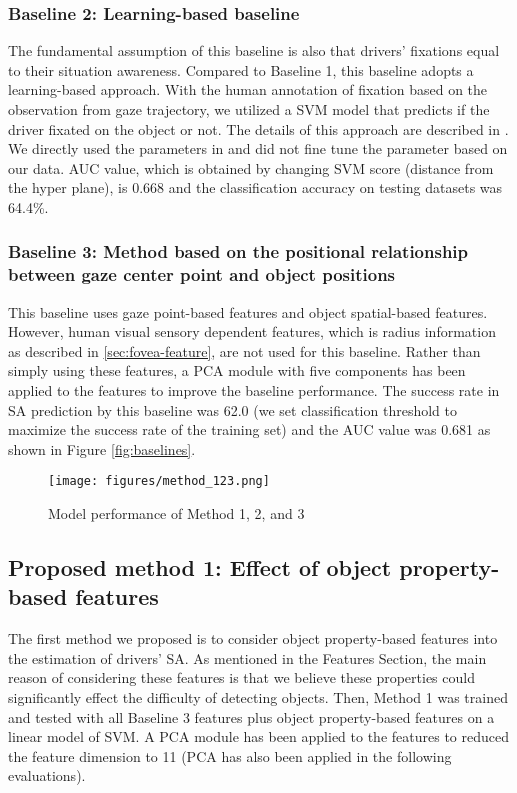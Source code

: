 \documentclass[letterpaper, 10 pt, conference]{ieeeconf}  %
\begin{document}
\subsubsection{Baseline 2: Learning-based baseline}

The fundamental assumption of this baseline is also that drivers' fixations equal to their situation awareness. Compared to Baseline 1, this baseline adopts a learning-based approach. With the human annotation of fixation based on the observation from gaze trajectory, we utilized a SVM model that predicts if the driver fixated on the object or not. The details of this approach are described in \cite{martin2018object}. We directly used the parameters in \cite{martin2018object} and did not fine tune the parameter based on our data. AUC value, which is obtained by changing SVM score (distance from the hyper plane), is 0.668 and the classification accuracy on testing datasets was 64.4\%.

\subsubsection{Baseline 3: Method based on the positional relationship between gaze center point and object positions}

This baseline uses gaze point-based features and object spatial-based features. However, human visual sensory dependent features, which is radius information as described in \ref{sec:fovea-feature}, are not used for this baseline. Rather than simply using these features, a PCA module with five components has been applied to the features to improve the baseline performance. The success rate in SA prediction by this baseline was 62.0 (we set classification threshold to maximize the success rate of the training set) and the AUC value was 0.681 as shown in Figure \ref{fig:baselines}.

\begin{figure}[!t]
    \centering
    \texttt{[image: figures/method\_123.png]}
    \caption{Model performance of Method 1, 2, and 3}
    \label{fig:performance}
\vspace{-3mm}
\end{figure}

\subsection{Proposed method 1: Effect of object property-based features}

The first method we proposed is to consider object property-based features into the estimation of drivers' SA. As mentioned in the Features Section, the main reason of considering these features is that we believe these properties could significantly effect the difficulty of detecting objects. Then, Method 1 was trained and tested with all Baseline 3 features plus object property-based features on a linear model of SVM. A PCA module has been applied to the features to reduced the feature dimension to 11 (PCA has also been applied in the following evaluations).
\end{document}
